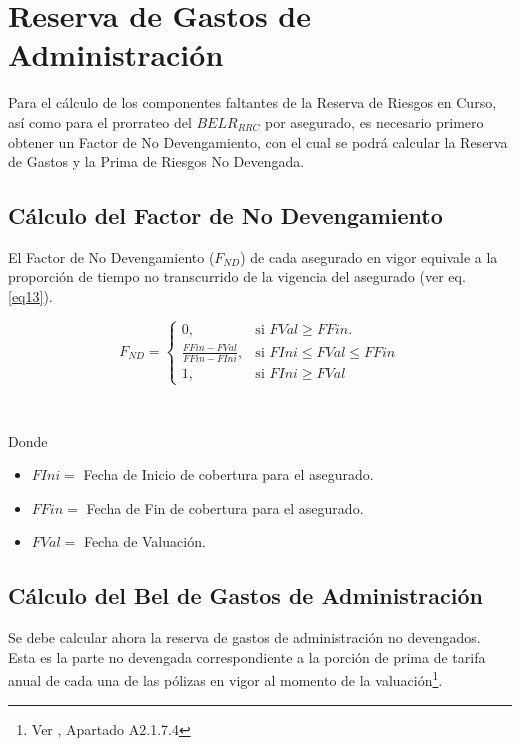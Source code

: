 \documentclass[11pt,twoside,openright,spanish]{report}
\numberwithin{equation}{chapter}
\numberwithin{figure}{chapter}
\numberwithin{table}{chapter}
\begin{document}
	 
\chapter{Reserva de Gastos de Administración}\label{metnum}

Para el cálculo de los componentes faltantes de la Reserva de Riesgos en Curso, así como para el prorrateo del $BELR_{RRC}$ por asegurado, es necesario primero obtener un Factor de No Devengamiento, con el cual se podrá calcular la Reserva de Gastos y la Prima de Riesgos No Devengada.

\section{Cálculo del Factor de No Devengamiento}

	El Factor de No Devengamiento ($F_{ND}$) de cada asegurado en vigor equivale a la proporción de tiempo no transcurrido de la vigencia del asegurado (ver eq. \ref{eq13}).


\begin{equation}	
	F_{ND}=\begin{cases}
		0, & \text{si } FVal \geqslant FFin.\\
		\frac{FFin-FVal}{FFin-FIni}, & \text{si } FIni \leqslant FVal \leqslant FFin\\
		1, & \text{si } FIni \geqslant FVal
	\end{cases}
	\label{eq13}
\end{equation}


$ $

Donde


\begin{itemize}
	\setlength\itemsep{-0.5em}
	\item $FIni=$ Fecha de Inicio de cobertura para el asegurado.
	
	\item $FFin=$ Fecha de Fin de cobertura para el asegurado.
	
	\item $FVal=$ Fecha de Valuación.
	
\end{itemize}



\section{Cálculo del Bel de Gastos de Administración}

Se debe calcular ahora la reserva de gastos de administración no devengados. Esta es la parte no devengada correspondiente a la porción de prima de tarifa anual de cada una de las pólizas en vigor al momento de la valuación\footnote{Ver \citet{SAnexoCUSF}, Apartado A2.1.7.4}.
\end{document}
